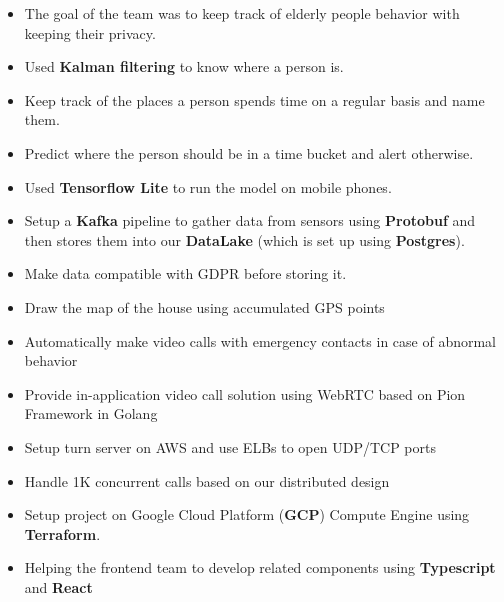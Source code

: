 \begin{itemize}
      \item The goal of the team was to keep track of elderly people behavior with keeping their privacy.
      \item Used \textbf{Kalman filtering} to know where a person is.
      \item Keep track of the places a person spends time on a regular basis and name them.
      \item Predict where the person should be in a time bucket and alert otherwise.
      \item Used \textbf{Tensorflow Lite} to run the model on mobile phones.
      \item Setup a \textbf{Kafka} pipeline to gather data from sensors using \textbf{Protobuf} and then stores them into our \textbf{DataLake} (which is set up using \textbf{Postgres}).
      \item Make data compatible with GDPR before storing it.
      \item Draw the map of the house using accumulated GPS points
      \item Automatically make video calls with emergency contacts in case of abnormal behavior
      \item Provide in-application video call solution using WebRTC based on Pion Framework in Golang
      \item Setup turn server on AWS and use ELBs to open UDP/TCP ports
      \item Handle 1K concurrent calls based on our distributed design
      \item Setup project on Google Cloud Platform (\textbf{GCP}) Compute Engine using \textbf{Terraform}.
      \item Helping the frontend team to develop related components using \textbf{Typescript} and \textbf{React}
\end{itemize}
